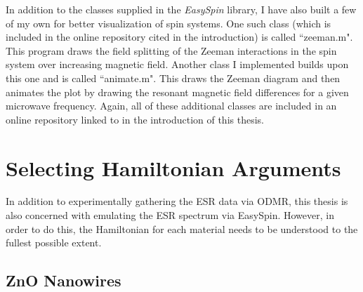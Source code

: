 \documentclass[oneside, astronomy, noacknowlegments]{BYUPhys}
\begin{document}
In addition to the classes supplied in the \textit{EasySpin} library, I have also built a few of my own for better visualization of spin systems. One such class (which is included in the online repository cited in the introduction) is called ``zeeman.m". This program draws the field splitting of the Zeeman interactions in the spin system over increasing magnetic field. Another class I implemented builds upon this one and is called ``animate.m". This draws the Zeeman diagram and then animates the plot by drawing the resonant magnetic field differences for a given microwave frequency. Again, all of these additional classes are included in an online repository linked to in the introduction of this thesis. 


\section{Selecting Hamiltonian Arguments}

In addition to experimentally gathering the ESR data via ODMR, this thesis is also concerned with emulating the ESR spectrum via EasySpin. However, in order to do this, the Hamiltonian for each material needs to be understood to the fullest possible extent.

\subsection{ZnO Nanowires}
\end{document}
